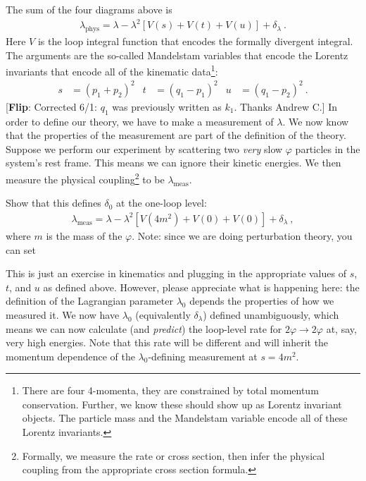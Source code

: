 \documentclass[12pt]{article}
\numberwithin{equation}{section}    %
\newcommand{\flip}[1]{{\color{red} [\textbf{Flip}: {#1}]}}
\begin{document}
The sum of the four diagrams above is
\begin{align}
	\lambda_\text{phys} = \lambda - \lambda^2
	\left[
		V(s)
		+ V(t)
		+ V(u)
	\right]
	+ \delta_\lambda
	 \ .
	\label{eq:defining}
\end{align}
Here $V$ is the loop integral function that encodes the formally divergent integral. The arguments are the so-called Mandelstam variables that encode the Lorentz invariants that encode all of the kinematic data\footnote{There are four 4-momenta, they are constrained by total momentum conservation. Further, we know these should show up as Lorentz invariant objects. The particle mass and the Mandelstam variable encode all of these Lorentz invariants.}:
\begin{align}
	s &= (p_1 + p_2)^2
	&
	t &= (q_1-p_1)^2
	&
	u &= (q_1-p_2)^2 \ .
\end{align}
\flip{Corrected 6/1: $q_1$ was previously written as $k_1$. Thanks Andrew C.}
In order to define our theory, we have to make a measurement of $\lambda$. We now know that the properties of the measurement are part of the definition of the theory. Suppose we perform our experiment by scattering two \emph{very} slow $\varphi$ particles in the system's rest frame. This means we can ignore their kinetic energies. We then measure the physical coupling\footnote{Formally, we measure the rate or cross section, then infer the physical coupling from the appropriate cross section formula.} to be $\lambda_\text{meas}$. 

Show that this defines $\delta_0$ at the one-loop level:
\begin{align}
	\lambda_\text{meas} = \lambda - \lambda^2\left[
		V(4m^2)
		+ V(0)
		+ V(0)
	\right]  +\delta_\lambda \ ,
\end{align}
where $m$ is the mass of the $\varphi$. Note: since we are doing perturbation theory, you can set 


This is just an exercise in kinematics and plugging in the appropriate values of $s$, $t$, and $u$ as defined above. However, please appreciate what is happening here: the definition of the Lagrangian parameter $\lambda_0$ depends the properties of how we measured it. We now have $\lambda_0$ (equivalently $\delta_\lambda$) defined unambiguously, which means we can now calculate (and \emph{predict}) the loop-level rate for $2\varphi\to 2\varphi$ at, say, very high energies. Note that this rate will be different and will inherit the momentum dependence of the $\lambda_0$-defining measurement at $s=4m^2$.
\end{document}
